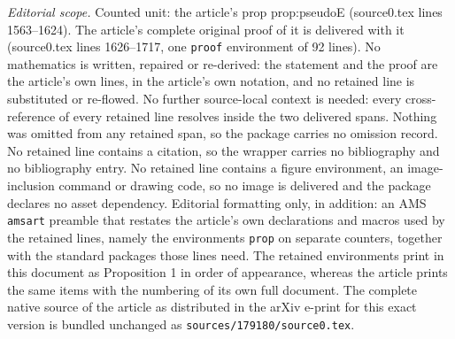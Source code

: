 \documentclass[10pt,a4paper]{amsart}
\begin{document}
\noindent\textit{Editorial scope.} Counted unit: the article's prop prop:pseudoE (source0.tex lines 1563--1624). The article's complete original proof of it is delivered with it (source0.tex lines 1626--1717, one \texttt{proof} environment of 92 lines). No mathematics is written, repaired or re-derived: the statement and the proof are the article's own lines, in the article's own notation, and no retained line is substituted or re-flowed.  No further source-local context is needed: every cross-reference of every retained line resolves inside the two delivered spans.  Nothing was omitted from any retained span, so the package carries no omission record.  No retained line contains a citation, so the wrapper carries no bibliography and no bibliography entry.  No retained line contains a figure environment, an image-inclusion command or drawing code, so no image is delivered and the package declares no asset dependency.  Editorial formatting only, in addition: an AMS \texttt{amsart} preamble that restates the article's own declarations and macros used by the retained lines, namely the environments \texttt{prop} on separate counters, together with the standard packages those lines need.  The retained environments print in this document as Proposition 1 in order of appearance, whereas the article prints the same items with the numbering of its own full document.  The complete native source of the article as distributed in the arXiv e-print for this exact version is bundled unchanged as \texttt{sources/179180/source0.tex}.
\end{document}
